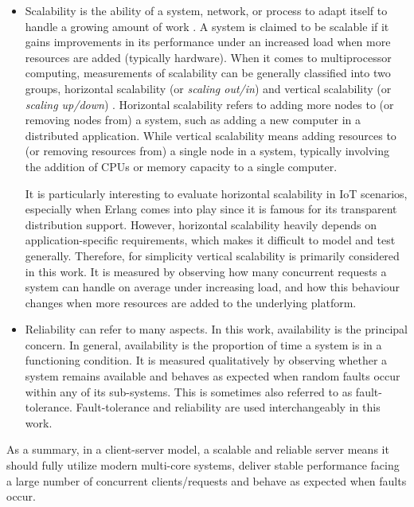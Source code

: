 \begin{itemize}

\item Scalability is the ability of a system, network, or process to adapt itself to handle a growing amount of work \autocite{Bondi:2000:CSI:350391.350432}. A system is claimed to be scalable if it gains improvements in its performance under an increased load when more resources are added (typically hardware). When it comes to multiprocessor computing, measurements of scalability can be generally classified into two groups, horizontal scalability (or \textit{scaling out/in}) and vertical scalability (or \textit{scaling up/down}) \autocite{4228359}. Horizontal scalability refers to adding more nodes to (or removing nodes from) a system, such as adding a new computer in a distributed application. While vertical scalability means adding resources to (or removing resources from) a single node in a system, typically involving the addition of CPUs or memory capacity to a single computer. 


It is particularly interesting to evaluate horizontal scalability in IoT scenarios, especially when Erlang comes into play since it is famous for its transparent distribution support. However, horizontal scalability heavily depends on application-specific requirements, which makes it difficult to model and test generally. Therefore, for simplicity vertical scalability is primarily considered in this work. It is measured by observing how many concurrent requests a system can handle on average under increasing load, and how this behaviour changes when more resources are added to the underlying platform. 

\item Reliability can refer to many aspects. In this work, availability is the principal concern. In general, availability is the proportion of time a system is in a functioning condition. It is measured qualitatively by observing whether a system remains available and behaves as expected when random faults occur within any of its sub-systems. This is sometimes also referred to as fault-tolerance. Fault-tolerance and reliability are used interchangeably in this work.

\end{itemize}



As a summary, in a client-server model, a scalable and reliable server means it should fully utilize modern multi-core systems, deliver stable performance facing a large number of concurrent clients/requests and behave as expected when faults occur.



